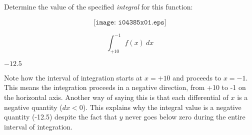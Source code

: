 

Determine the value of the specified {\it integral} for this function:

$$\texttt{[image: i04385x01.eps]}$$

$$\int_{+10}^{-1} f(x) \> dx$$







$-12.5$

\vskip 10pt

Note how the interval of integration starts at $x = +10$ and proceeds to $x = -1$.  This means the integration proceeds in a negative direction, from +10 to -1 on the horizontal axis.  Another way of saying this is that each differential of $x$ is a negative quantity ($dx < 0$).  This explains why the integral value is a negative quantity (-12.5) despite the fact that $y$ never goes below zero during the entire interval of integration.











